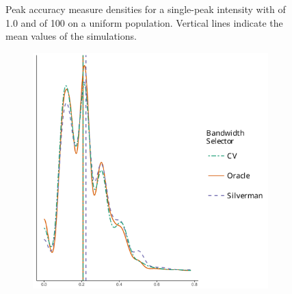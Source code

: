 \begin{figure}[htbp]
\begin{subfigure}[b]{0.45\textwidth}
        \label{fig:peaks:unif_100_1.0_1h:height}
    \end{subfigure}
    \caption[Peak accuracy: Single-peak of 100 on uniform population]{Peak accuracy measure densities for a single-peak intensity with  of 1.0 and  of 100 on a uniform population. Vertical lines indicate the mean values of the simulations.}
    \label{fig:peaks:unif_100_1.0_1h}
\end{figure}

\begin{figure}[htbp]
    \centering
    \begin{subfigure}[b]{0.45\textwidth}
        \includegraphics[width=\textwidth]{output/centroid-dist-histogram}
    \end{subfigure}
    \begin{subfigure}[b]{0.45\textwidth}

\end{subfigure}
\end{figure}
